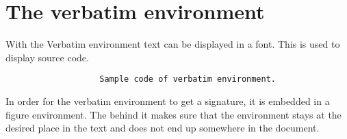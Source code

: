 
\section{The verbatim environment}

With the Verbatim environment text can be displayed in a
 font. This is used to display source code.

\begin{figure}[H]
    \centering
    \begin{verbbox}
\begin{figure}[H]
    \small
    \centering
    \begin{BVerbatim}
        Sample code of verbatim environment.
    \end{BVerbatim}
\end{figure}
    \end{verbbox}
    \theverbbox
\end{figure}

In order for the verbatim environment to get a signature, it is embedded in a
figure environment. The \tsTextMonospace{[H]} behind it makes sure that the
environment stays at the desired place in the text and does not end up
somewhere in the document.
\bigbreak

